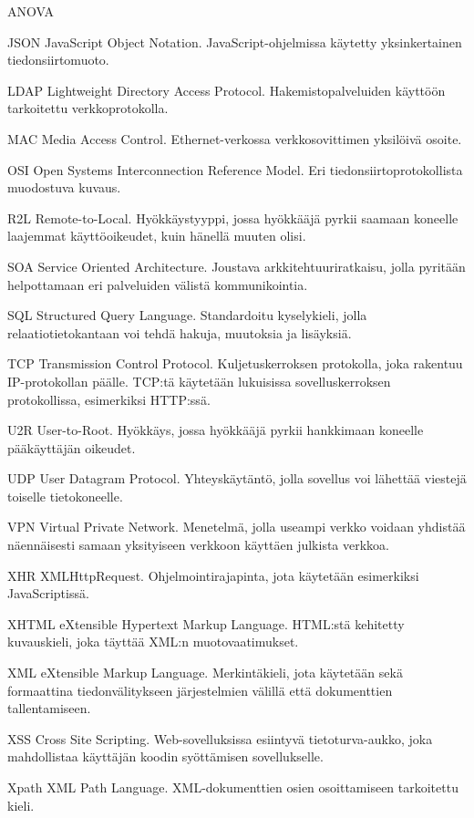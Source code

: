 \begin{abbrlist}{ANOVA}
\item[JSON]	JavaScript Object Notation. JavaScript-ohjelmissa käytetty yksinkertainen tiedonsiirtomuoto.
\item[LDAP]	Lightweight Directory Access Protocol. Hakemistopalveluiden käyttöön tarkoitettu verkkoprotokolla.
\item[MAC]	Media Access Control. Ethernet-verkossa verkkosovittimen yksilöivä osoite.
\item[OSI]	Open Systems Interconnection Reference Model. Eri tiedonsiirtoprotokollista muodostuva kuvaus.
\item[R2L]	Remote-to-Local. Hyökkäystyyppi, jossa hyökkääjä pyrkii saamaan koneelle laajemmat käyttöoikeudet, kuin hänellä muuten olisi.
\item[SOA]	Service Oriented Architecture. Joustava arkkitehtuuriratkaisu, jolla pyritään helpottamaan eri palveluiden välistä kommunikointia.
\item[SQL]	Structured Query Language. Standardoitu kyselykieli, jolla relaatiotietokantaan voi tehdä hakuja, muutoksia ja lisäyksiä.
\item[TCP]	Transmission Control Protocol. Kuljetuskerroksen protokolla, joka rakentuu IP-protokollan päälle. TCP:tä käytetään lukuisissa sovelluskerroksen protokollissa, esimerkiksi HTTP:ssä.
\item[U2R]	User-to-Root. Hyökkäys, jossa hyökkääjä pyrkii hankkimaan koneelle pääkäyttäjän oikeudet.
\item[UDP]	User Datagram Protocol. Yhteyskäytäntö, jolla sovellus voi lähettää viestejä toiselle tietokoneelle.
\item[VPN]	Virtual Private Network. Menetelmä, jolla useampi verkko voidaan yhdistää näennäisesti samaan yksityiseen verkkoon käyttäen julkista verkkoa. 
\item[XHR]	XMLHttpRequest. Ohjelmointirajapinta, jota käytetään esimerkiksi Ja\-va\-Scrip\-tis\-sä.
\item[XHTML]    eXtensible Hypertext Markup Language. HTML:stä kehitetty kuvauskieli, joka täyttää XML:n muotovaatimukset.
\item[XML]	eXtensible Markup Language. Merkintäkieli, jota käytetään sekä formaattina tiedonvälitykseen järjestelmien välillä että dokumenttien tallentamiseen.
\item[XSS]	Cross Site Scripting. Web-sovelluksissa esiintyvä tietoturva-aukko, joka mahdollistaa käyttäjän koodin syöttämisen sovellukselle.  
\item[Xpath]    XML Path Language. XML-dokumenttien osien osoittamiseen tarkoitettu kieli.	
\end{abbrlist}
